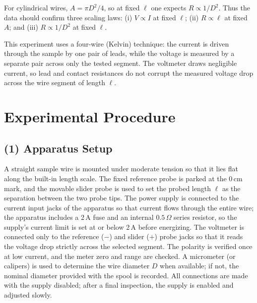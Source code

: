 \documentclass[12pt]{article}
\numberwithin{equation}{section}
\begin{document}
For cylindrical wires, $A=\pi D^2/4$, so at fixed $\ell$ one expects $R \propto 1/D^2$. Thus the data should confirm three scaling laws: (i) $V \propto I$ at fixed $\ell$; (ii) $R \propto \ell$ at fixed $A$; and (iii) $R \propto 1/D^2$ at fixed $\ell$.

This experiment uses a four-wire (Kelvin) technique: the current is driven through the sample by one pair of leads, while the voltage is measured by a separate pair across only the tested segment. The voltmeter draws negligible current, so lead and contact resistances do not corrupt the measured voltage drop across the wire segment of length $\ell$.

\section{Experimental Procedure}

\subsection*{(1) Apparatus Setup}
A straight sample wire is mounted under moderate tension so that it lies flat along the built-in length scale. The fixed reference probe is parked at the 0\,cm mark, and the movable slider probe is used to set the probed length $\ell$ as the separation between the two probe tips. The power supply is connected to the current input jacks of the apparatus so that current flows through the entire wire; the apparatus includes a 2\,A fuse and an internal $0.5\,\Omega$ series resistor, so the supply’s current limit is set at or below 2\,A before energizing. The voltmeter is connected only to the reference ($-$) and slider ($+$) probe jacks so that it reads the voltage drop strictly across the selected segment. The polarity is verified once at low current, and the meter zero and range are checked. A micrometer (or calipers) is used to determine the wire diameter $D$ when available; if not, the nominal diameter provided with the spool is recorded. All connections are made with the supply disabled; after a final inspection, the supply is enabled and adjusted slowly.
\end{document}
